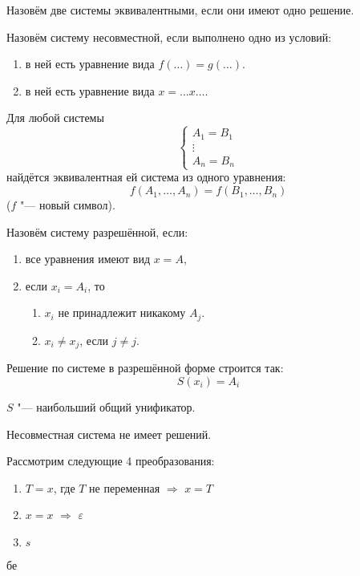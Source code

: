 \begin{definition}
    Назовём две системы эквивалентными, если они имеют одно решение.
\end{definition}

\begin{definition}
    Назовём систему несовместной, если выполнено одно из условий:
    \begin{enumerate}
        \item в ней есть уравнение вида $f(\ldots)=g(\ldots)$.
        \item в ней есть уравнение вида $x = \ldots x \ldots$.
    \end{enumerate}
\end{definition}

\begin{statement}
    Для любой системы
    \[
        \begin{cases} A_1 = B_1 \\ \vdots \\ A_n = B_n \end{cases}
    \]
    найдётся эквивалентная ей система из одного уравнения:
    \[
        f(A_1, \ldots, A_n) = f(B_1, \ldots, B_n)
    \]
    ($f$ "--- новый символ).
\end{statement}

\begin{definition}
    Назовём систему разрешённой, если:
    \begin{enumerate}
        \item все уравнения имеют вид $x = A$,
        \item если $x_i = A_i$, то
        \begin{enumerate}[label=(\asbuk*)]
            \item $x_i$ не принадлежит никакому $A_j$.
            \item $x_i \neq x_j$, если $j \neq j$.
        \end{enumerate}
    \end{enumerate}
\end{definition}

Решение по системе в разрешённой форме строится так:
\[
    S(x_i)=A_i
\]
\todo

\begin{statement}
    $S$ "--- наибольший общий унификатор.
\end{statement}

\begin{statement}
    Несовместная система не имеет решений.
\end{statement}

Рассмотрим следующие 4 преобразования:
\begin{enumerate}[label=(\asbuk*)]
    \item $T=x$, где $T$ не переменная $\Rightarrow$ $x=T$
    \item $x=x$ $\Rightarrow$ $\varepsilon$
    \item $s$
\end{enumerate}

бе
